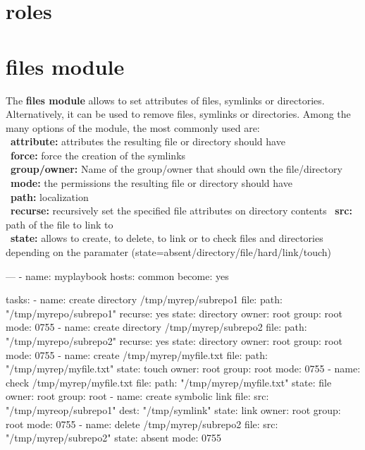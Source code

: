 \documentclass{refcard}
\begin{document}
\section{roles}

\section{files module}

The \textbf{files module} allows to set attributes of files, symlinks or directories. Alternatively, it can be used to remove files, symlinks or directories. Among the many options of the module, the most commonly used are:\\
\textbullet\ \textbf{attribute:} attributes the resulting file or directory should have\\
\textbullet\ \textbf{force:} force the creation of the symlinks\\
\textbullet\ \textbf{group/owner:} Name of the group/owner that should own the file/directory\\
\textbullet\ \textbf{mode:} the permissions the resulting file or directory should have\\
\textbullet\ \textbf{path:} localization\\
\textbullet\ \textbf{recurse:} recursively set the specified file attributes on directory contents
\textbullet\ \textbf{src:} path of the file to link to\\
\textbullet\ \textbf{state:} allows to create, to delete, to link or to check files and directories depending on the paramater (state=absent/directory/file/hard/link/touch)\\

\begin{yamlbox}
---
- name: myplaybook
  hosts: common
  become: yes
    
  tasks:
  - name: create directory /tmp/myrep/subrepo1
    file:
      path: "/tmp/myrepo/subrepo1"
      recurse: yes
      state: directory
      owner: root
      group: root
      mode: 0755
  - name: create directory /tmp/myrep/subrepo2
    file:
      path: "/tmp/myrepo/subrepo2"
      recurse: yes
      state: directory
      owner: root
      group: root
      mode: 0755
  - name: create /tmp/myrep/myfile.txt
    file: 
      path: "/tmp/myrep/myfile.txt"
      state: touch
      owner: root
      group: root
      mode: 0755
  - name: check /tmp/myrep/myfile.txt
    file: 
      path: "/tmp/myrep/myfile.txt"
      state: file
      owner: root
      group: root
  - name: create symbolic link
    file:
      src: "/tmp/myreop/subrepo1"
      dest: "/tmp/symlink"
      state: link
      owner: root
      group: root
      mode: 0755
  - name: delete /tmp/myrep/subrepo2
    file:
      src: "/tmp/myrep/subrepo2"
      state: absent
      mode: 0755
\end{yamlbox}
\end{document}
